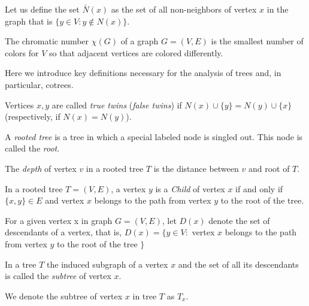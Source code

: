 Let us define the set $\bar{N}(x)$ as the set of all non-neighbors of vertex $x$ in the graph that is $\{ y \in V \colon y \notin N(x) \}$.

\begin{definition}
    The chromatic number $\chi(G)$ of a graph $G=(V,E)$ is the smallest number of colors for $V$ so that adjacent vertices are colored differently. 
\end{definition}
Here we introduce key definitions necessary for the analysis of trees and, in particular, cotrees.

\begin{definition}
Vertices $x,y$ are called \emph{true twins} (\emph{false twins}) if $N(x) \cup \{y\} = N(y) \cup \{x\}$ (respectively, if $N(x) = N(y)$).
\end{definition}

\begin{definition}
    A \emph{rooted tree} is a tree in which a special labeled node is singled out. This node is called the \emph{root}.
\end{definition}

\begin{definition}[Depth]
The \emph{depth} of vertex $v$ in a rooted tree $T$ is the distance between $v$ and root of $T$. 
\end{definition}

\begin{definition}[Child]
    In a rooted tree $T=(V,E)$, a vertex $y$ is a \emph{Child} of vertex $x$ if and only if $\{x,y\} \in E$ and vertex $x$ belongs to the path from vertex $y$ to the root of the tree.
\end{definition}

\begin{definition}[Descendants, $D(x)$]
For a given vertex x in graph $G=(V,E)$, let $D(x)$ denote the set of descendants of a vertex, that is, $D(x)=\{y \in V \colon $  vertex $x$ belongs to the path from vertex $y$ to the root of the tree $ \}$
\end{definition}

\begin{definition}[Subtree]
    In a tree $T$ the induced subgraph of a vertex $x$ and the set of all its descendants is called the \emph{subtree} of vertex $x$.
\end{definition}


We denote the subtree of vertex $x$ in tree $T$ as $T_x$.



